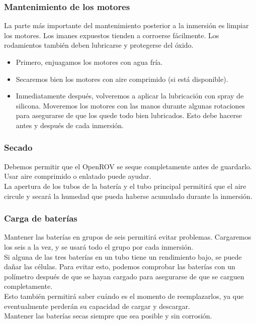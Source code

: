\subsubsection{Mantenimiento de los motores}
\label{subsubsec:mantenimiento}
La parte más importante del mantenimiento posterior a la inmersión es limpiar los motores. Los imanes expuestos tienden a corroerse fácilmente. Los rodamientos también deben lubricarse y protegerse del óxido.
\begin{itemize}
\item Primero, enjuagamos los motores con agua fría.
\item Secaremos bien los motores con aire comprimido (si está disponible).
\item Inmediatamente después, volveremos a aplicar la lubricación con spray de silicona. Moveremos los motores con las manos durante algunas rotaciones para asegurarse de que los quede todo bien lubricados. Esto debe hacerse antes y después de cada inmersión.
\end{itemize}
  
\subsubsection{Secado}
\label{subsubsec:secado}
Debemos permitir que el OpenROV se seque completamente antes de guardarlo.
Usar aire comprimido o enlatado puede ayudar.
\\La apertura de los tubos de la batería y el tubo principal permitirá que el aire circule y secará la humedad que pueda haberse acumulado durante la inmersión.
  
\subsubsection{Carga de baterías}
\label{subsubsec:bateria}
Mantener las baterías en grupos de seis permitirá evitar problemas. Cargaremos los seis a la vez, y se usará todo el grupo por cada inmersión.
\\Si alguna de las tres baterías en un tubo tiene un rendimiento bajo, se puede dañar las células. Para evitar esto, podemos comprobar las baterías con un polímetro después de que se hayan cargado para asegurarse de que se carguen completamente.
\\Esto también permitirá saber cuándo es el momento de reemplazarlos, ya que eventualmente perderán su capacidad de cargar y descargar.
\\Mantener las baterías secas siempre que sea posible y sin corrosión.


